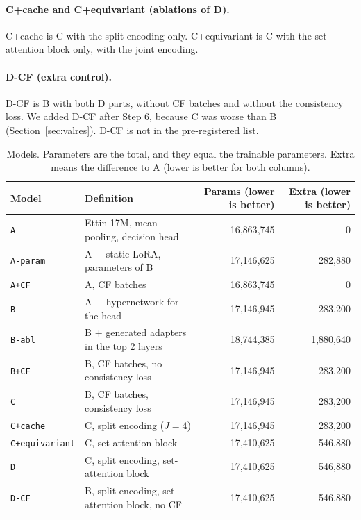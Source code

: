 \documentclass[11pt,a4paper]{article}
\newcommand{\M}[1]{\texttt{#1}}
\begin{document}
\paragraph{C+cache and C+equivariant (ablations of D).}
C+cache is C with the split encoding only.
C+equivariant is C with the set-attention block only, with the joint encoding.

\paragraph{D-CF (extra control).}
D-CF is B with both D parts, without CF batches and without the consistency loss.
We added D-CF after Step 6, because C was worse than B (Section~\ref{sec:valres}).
D-CF is not in the pre-registered list.

\begin{table}[t]
\centering
\caption{Models. Parameters are the total, and they equal the trainable parameters. Extra means the difference to A (lower is better for both columns).}\label{tab:models}
\small
\begin{tabular}{lp{4.6cm}rr}
\toprule
Model & Definition & Params (lower is better) & Extra (lower is better) \\
\midrule
\M{A} & Ettin-17M, mean pooling, decision head & 16{,}863{,}745 & 0 \\
\M{A-param} & A + static LoRA, parameters of B & 17{,}146{,}625 & 282{,}880 \\
\M{A+CF} & A, CF batches & 16{,}863{,}745 & 0 \\
\M{B} & A + hypernetwork for the head & 17{,}146{,}945 & 283{,}200 \\
\M{B-abl} & B + generated adapters in the top 2 layers & 18{,}744{,}385 & 1{,}880{,}640 \\
\M{B+CF} & B, CF batches, no consistency loss & 17{,}146{,}945 & 283{,}200 \\
\M{C} & B, CF batches, consistency loss & 17{,}146{,}945 & 283{,}200 \\
\M{C+cache} & C, split encoding ($J=4$) & 17{,}146{,}945 & 283{,}200 \\
\M{C+equivariant} & C, set-attention block & 17{,}410{,}625 & 546{,}880 \\
\M{D} & C, split encoding, set-attention block & 17{,}410{,}625 & 546{,}880 \\
\M{D-CF} & B, split encoding, set-attention block, no CF & 17{,}410{,}625 & 546{,}880 \\
\bottomrule
\end{tabular}
\end{table}
\end{document}
